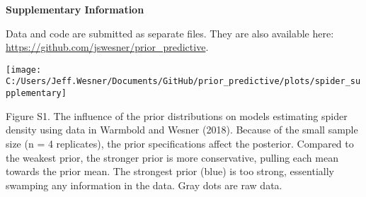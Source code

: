 \documentclass[
  12pt,
]{article}
\begin{document}
\textbf{Supplementary Information}

Data and code are submitted as separate files. They are also available
here: \url{https://github.com/jswesner/prior_predictive}.

\texttt{[image: C:/Users/Jeff.Wesner/Documents/GitHub/prior\_predictive/plots/spider\_supplementary]}

Figure S1. The influence of the prior distributions on models estimating
spider density using data in Warmbold and Wesner (2018). Because of the
small sample size (n = 4 replicates), the prior specifications affect
the posterior. Compared to the weakest prior, the stronger prior is more
conservative, pulling each mean towards the prior mean. The strongest
prior (blue) is too strong, essentially swamping any information in the
data. Gray dots are raw data.
\end{document}
